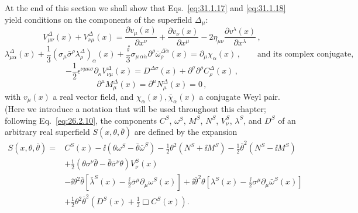 At the end of this section we shall show that Eqs.~\eqref{eq:31.1.17} and
\eqref{eq:31.1.18} yield conditions on the components of the superfield
\(\Delta_\mu\):
\begin{equation}
  V_{\mu\nu}^\Delta(x)+V_{\nu\mu}^\Delta(x)
  =\frac{\partial v_\mu(x)}{\partial x^\nu}
   +\frac{\partial v_\nu(x)}{\partial x^\mu}
   -2\eta_{\mu\nu}\frac{\partial v^\lambda(x)}{\partial x^\lambda}\,,
  \tag{31.1.20}\label{eq:31.1.20}
\end{equation}
\begin{equation}
  \lambda_{\mu\alpha}^\Delta(x)
  +\frac13
    (\sigma_\mu\bar\sigma^\rho\lambda_\rho^\Delta)_\alpha(x)
  +\frac{\ii}{3}\sigma_{\mu\,\alpha\dot\alpha}
    \partial^\rho\bar\omega_\rho^{\Delta\dot\alpha}(x)
  =\partial_\mu\chi_\alpha(x)\,,
  \qquad\text{and its complex conjugate},
  \tag{31.1.21}\label{eq:31.1.21}
\end{equation}
\begin{equation}
  -\frac12\epsilon^{\nu\mu\kappa\sigma}
    \partial_\kappa V_{\nu\mu}^\Delta(x)
  =D^{\Delta\sigma}(x)+\partial^\sigma\partial^\rho C_\rho^\Delta(x)\,,
  \tag{31.1.22}\label{eq:31.1.22}
\end{equation}
\begin{equation}
  \partial^\mu M_\mu^\Delta(x)
  =\partial^\mu N_\mu^\Delta(x)=0\,,
  \tag{31.1.23}\label{eq:31.1.23}
\end{equation}
with \(v_\mu(x)\) a real vector field, and
\(\chi_\alpha(x),\bar\chi_{\dot\alpha}(x)\) a conjugate Weyl pair.
(Here we introduce a notation that will be used throughout this
chapter; following Eq.~\eqref{eq:26.2.10}, the components \(C^S\),
\(\omega^S\), \(M^S\), \(N^S\), \(V_\nu^S\), \(\lambda^S\), and \(D^S\) of
an arbitrary real superfield \(S(x,\theta,\bar\theta)\) are defined by the
expansion
\begin{equation}
  \begin{aligned}
  S(x,\theta,\bar\theta)={}&C^S(x)
  -\ii\left(\theta\omega^S-\bar\theta\bar\omega^S\right)
  -\frac12\theta^2(N^S+\ii M^S)
  -\frac12\bar\theta^2(N^S-\ii M^S)
  \\
  &+\frac12\left(
    \theta\sigma^\nu\bar\theta
    -\bar\theta\bar\sigma^\nu\theta\right)V_\nu^S(x)
  \\
  &-\ii\theta^2\bar\theta\left[
      \bar\lambda^S(x)
      -\frac{\ii}{2}\bar\sigma^\mu\partial_\mu\omega^S(x)
    \right]
   +\ii\bar\theta^2\theta\left[
      \lambda^S(x)
      -\frac{\ii}{2}\sigma^\mu\partial_\mu\bar\omega^S(x)
    \right]
  \\
  &+\frac12\theta^2\bar\theta^2
    \left(D^S(x)+\frac12\Box C^S(x)\right).
  \end{aligned}
  \tag{31.1.24}\label{eq:31.1.24}
\end{equation}
